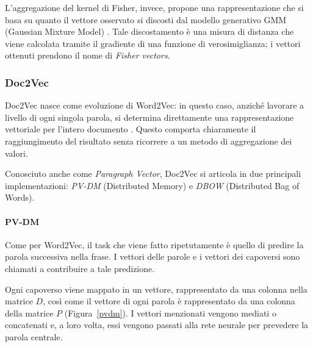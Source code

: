 \documentclass[12pt]{report}
\theoremstyle{definition}
\begin{document}
L'aggregazione del kernel di Fisher, invece, propone una rappresentazione che si basa su quanto il vettore osservato si discosti dal modello generativo GMM (Gaussian Mixture Model) \cite{37}. Tale discostamento è una misura di distanza che viene calcolata tramite il gradiente di una funzione di verosimiglianza; i vettori ottenuti prendono il nome di \textit{Fisher vectors}.

\subsubsection{Doc2Vec} \label{d2v}
Doc2Vec nasce come evoluzione di Word2Vec: in questo caso, anziché lavorare a livello di ogni singola parola, si determina direttamente una rappresentazione vettoriale per l'intero documento \cite{24}.
Questo comporta chiaramente il raggiungimento del risultato senza ricorrere a un metodo di aggregazione dei valori.

Conosciuto anche come \textit{Paragraph Vector}, Doc2Vec si articola in due principali implementazioni: \textit{PV-DM} (Distributed Memory) e \textit{DBOW} (Distributed Bag of Words).

\paragraph{PV-DM} 
Come per Word2Vec, il task che viene fatto ripetutamente è quello di predire la parola successiva nella frase. I vettori delle parole e i vettori dei capoversi sono chiamati a contribuire a tale predizione.

Ogni capoverso viene mappato in un vettore, rappresentato da una colonna nella matrice $D$, così come il vettore di ogni parola è rappresentato da una colonna della matrice $P$ (Figura~\ref{pvdm}). I vettori menzionati vengono mediati o concatenati e, a loro volta, essi vengono passati alla rete neurale per prevedere la parola centrale.
\end{document}
